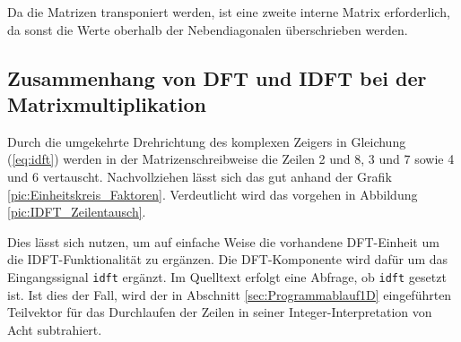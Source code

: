 Da die Matrizen transponiert werden, ist eine zweite interne Matrix erforderlich, da sonst die Werte oberhalb der
Nebendiagonalen überschrieben werden.

% 
% 
% 
% 


\subsection{Zusammenhang von DFT und IDFT bei der Matrixmultiplikation}\label{sec:idft}

Durch die umgekehrte Drehrichtung des komplexen Zeigers in Gleichung (\ref{eq:idft}) werden in der Matrizenschreibweise die Zeilen 2 und 8, 3 und 7 sowie 4 und 6 vertauscht.
Nachvollziehen lässt sich das gut anhand der Grafik \ref{pic:Einheitskreis_Faktoren}. 
Verdeutlicht wird das vorgehen in Abbildung \ref{pic:IDFT_Zeilentausch}.

Dies lässt sich nutzen, um auf einfache Weise die vorhandene DFT-Einheit um die IDFT-Funktionalität zu ergänzen. 
Die DFT-Komponente wird dafür um das Eingangssignal \texttt{idft} ergänzt. Im Quelltext erfolgt eine Abfrage, ob \texttt{idft} gesetzt ist. Ist dies der Fall, wird der 
in Abschnitt \ref{sec:Programmablauf1D} eingeführten Teilvektor für das Durchlaufen der Zeilen in seiner Integer-Interpretation von Acht subtrahiert.

